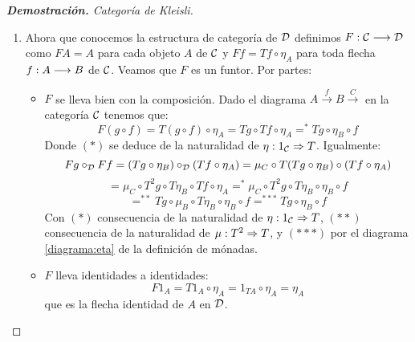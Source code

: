 \begin{proof}[\textbf{Demostración. } Categoría de Kleisli]
\begin{enumerate}
\begin{itemize}
    Esto muestra que en la categoría $\D$ la flecha $\eta_A$ es la
    identidad del objeto $A$ para cualquier objeto $A$ de la categoría.
    \end{itemize}
  \item Ahora que conocemos la estructura de categoría
    de $\D$ definimos $F : \mathcal{C}\longrightarrow \mathcal{D}$ como $FA = A$
    para cada objeto $A$ de $\mathcal{C}$ y $Ff = Tf \circ \eta_A$ para
    toda flecha $f: A\longrightarrow B$ de $\mathcal{C}$.
    Veamos que $F$ es un funtor. Por partes:
    \begin{itemize}
    \item $F$ se lleva bien con la composición. Dado el diagrama
      $A \xrightarrow{f} B \xrightarrow{C}$ en la categoría $\mathcal{C}$
      tenemos que:
      $$F(g \circ f) = T(g \circ f) \circ \eta_A
      = Tg \circ Tf \circ \eta_A
      =^* Tg \circ \eta_B \circ f$$
      Donde $(*)$ se deduce de la naturalidad de
      $\eta : 1_{\mathcal{C}}\Rightarrow T$. Igualmente:
      $$Fg \circ_{\mathcal{D}} Ff = (Tg \circ \eta_B) \circ_{\mathcal{D}} (Tf \circ \eta_A)
      = \mu_C \circ T(Tg \circ \eta_B) \circ (Tf \circ \eta_A)$$
      $$= \mu_C \circ T^2g \circ T\eta_B \circ Tf \circ \eta_A
      =^* \mu_C \circ T^2g \circ T\eta_B \circ \eta_B \circ f$$
      $$=^{**} Tg \circ \mu_B \circ T\eta_B \circ \eta_B \circ f
      =^{***} Tg \circ \eta_B \circ f$$
      Con $(*)$ consecuencia de la naturalidad de
      $\eta: 1_{\mathcal{C}}\Rightarrow T$, $(**)$ consecuencia de la naturalidad
      de $\mu : T^2\Rightarrow T$, y $(***)$ por el diagrama
      \eqref{diagrama:eta} de la definición de mónadas.


    \item $F$ lleva identidades a identidades:
      $$F1_A = T1_A \circ \eta_A = 1_{TA} \circ \eta_A = \eta_A$$
      que es la flecha identidad de $A$ en $\D$.

    \end{itemize}


\end{enumerate}
\end{proof}
